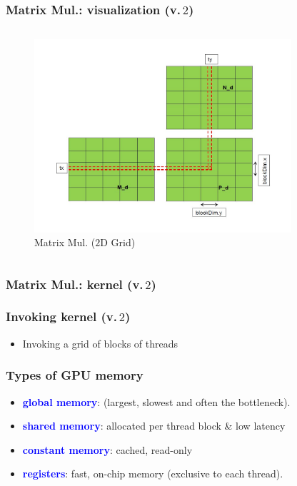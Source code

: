 \begin{frame}
	\frametitle{Matrix Mul.: visualization (v.\,$2$)}
      \begin{columns}
           \begin{figure}[H]
              \centering
              \includegraphics[width=0.85\textwidth]{./img/mulB.jpg}
		   \caption{\small{Matrix Mul. ($2$D Grid)}}
           \end{figure}
     \end{columns}
\end{frame}


\begin{frame}
        \frametitle{Matrix Mul.: kernel (v.\,$2$)}
        
\end{frame}

\begin{frame}
        \frametitle{Invoking kernel (v.\,$2$)}
        \begin{itemize}
                \item Invoking a grid of blocks of threads
        
        \end{itemize}
\end{frame}


\begin{frame}
\frametitle{Types of GPU memory}
\begin{itemize}
   \item \textbf{\textcolor{blue}{global memory}}: (largest, slowest and often the bottleneck).
   \item \textbf{\textcolor{blue}{shared memory}}: allocated per thread block \& low latency
   \item \textbf{\textcolor{blue}{constant memory}}: cached, read-only
   \item \textbf{\textcolor{blue}{registers}}: fast, on-chip memory (exclusive to each thread).
\end{itemize}
\end{frame}


